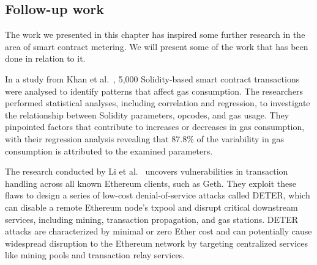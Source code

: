 \subsection{Follow-up work}
The work we presented in this chapter has inspired some further research in the area of smart contract metering.
We will present some of the work that has been done in relation to it.

In a study from Khan et al.~\cite{Khan2021GasCA}, 5,000 Solidity-based smart contract transactions were analysed to identify patterns that affect gas consumption.
The researchers performed statistical analyses, including correlation and regression, to investigate the relationship between Solidity parameters, opcodes, and gas usage.
They pinpointed factors that contribute to increases or decreases in gas consumption, with their regression analysis revealing that 87.8\% of the variability in gas consumption is attributed to the examined parameters.

The research conducted by Li et al.~\cite{10.1145/3460120.3485369} uncovers vulnerabilities in transaction handling across all known Ethereum clients, such as Geth. They exploit these flaws to design a series of low-cost denial-of-service attacks called DETER, which can disable a remote Ethereum node's txpool and disrupt critical downstream services, including mining, transaction propagation, and gas stations. DETER attacks are characterized by minimal or zero Ether cost and can potentially cause widespread disruption to the Ethereum network by targeting centralized services like mining pools and transaction relay services.
